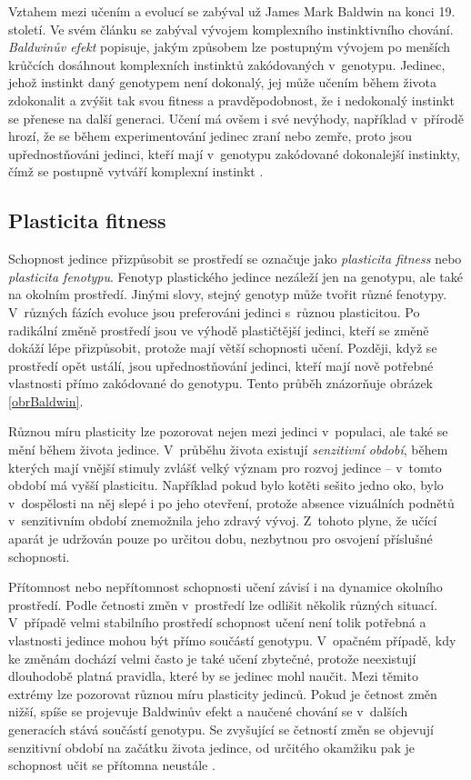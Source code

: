 Vztahem mezi učením a evolucí se zabýval už James Mark Baldwin na konci 19. století. Ve svém článku \cite{Baldwin} se zabýval vývojem komplexního instinktivního chování. \emph{Baldwinův efekt} popisuje, jakým způsobem lze postupným vývojem po menších krůčcích dosáhnout komplexních instinktů zakódovaných v~genotypu. Jedinec, jehož instinkt daný genotypem není dokonalý, jej může učením během života zdokonalit a zvýšit tak svou fitness a pravděpodobnost, že i nedokonalý instinkt se přenese na další generaci. Učení má ovšem i své nevýhody, například v~přírodě hrozí, že se během experimentování jedinec zraní nebo zemře, proto jsou upřednostňováni jedinci, kteří mají v~genotypu zakódované dokonalejší instinkty, čímž se postupně vytváří komplexní instinkt \cite{HowToShiftBias}.

\subsection{Plasticita fitness}
\label{secPlasticity}

Schopnost jedince přizpůsobit se prostředí se označuje jako \emph{plasticita fitness} nebo \emph{plasticita fenotypu}. Fenotyp plastického jedince nezáleží jen na genotypu, ale také na okolním prostředí. Jinými slovy, stejný genotyp může tvořit různé fenotypy. V~různých fázích evoluce jsou preferováni jedinci s~různou plasticitou. Po radikální změně prostředí jsou ve výhodě plastičtější jedinci, kteří se změně dokáží lépe přizpůsobit, protože mají větší schopnosti učení. Později, když se prostředí opět ustálí, jsou upřednostňování jedinci, kteří mají nově potřebné vlastnosti přímo zakódované do genotypu. Tento průběh znázorňuje obrázek \ref{obrBaldwin}.

Různou míru plasticity lze pozorovat nejen mezi jedinci v~populaci, ale také se mění během života jedince. V~průběhu života existují \emph{senzitivní období}, během kterých mají vnější stimuly zvlášť velký význam pro rozvoj jedince -- v~tomto období má vyšší plasticitu. Například pokud bylo kotěti sešito jedno oko, bylo v~dospělosti na něj slepé i po jeho otevření, protože absence vizuálních podnětů v~senzitivním období znemožnila jeho zdravý vývoj. Z~tohoto plyne, že učící aparát je udržován pouze po určitou dobu, nezbytnou pro osvojení příslušné schopnosti.

Přítomnost nebo nepřítomnost schopnosti učení závisí i na dynamice okolního prostředí. Podle četnosti změn v~prostředí lze odlišit několik různých situací. V~případě velmi stabilního prostředí schopnost učení není tolik potřebná a vlastnosti jedince mohou být přímo součástí genotypu. V~opačném případě, kdy ke změnám dochází velmi často je také učení zbytečné, protože neexistují dlouhodobě platná pravidla, které by se jedinec mohl naučit. Mezi těmito extrémy lze pozorovat různou míru plasticity jedinců. Pokud je četnost změn nižší, spíše se projevuje Baldwinův efekt a naučené chování se v~dalších generacích stává součástí genotypu. Se zvyšující se četností změn se objevují senzitivní období na začátku života jedince, od určitého okamžiku pak je schopnost učit se přítomna neustále \cite{EllefsenBalancing}.

